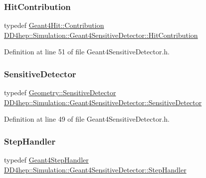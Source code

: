 \subsubsection{\texorpdfstring{Hit\+Contribution}{HitContribution}}
{\footnotesize\ttfamily typedef \hyperlink{class_d_d4hep_1_1_simulation_1_1_geant4_hit_a03a5270c4d1410302fe278ce6a47f268}{Geant4\+Hit\+::\+Contribution} \hyperlink{class_d_d4hep_1_1_simulation_1_1_geant4_sensitive_detector_a82e16b04c44370489f88b1e6a1ef2ab0}{D\+D4hep\+::\+Simulation\+::\+Geant4\+Sensitive\+Detector\+::\+Hit\+Contribution}}



Definition at line 51 of file Geant4\+Sensitive\+Detector.\+h.

\hypertarget{class_d_d4hep_1_1_simulation_1_1_geant4_sensitive_detector_a6375f9a4f776b531e443483ff9fa8c28}{}\label{class_d_d4hep_1_1_simulation_1_1_geant4_sensitive_detector_a6375f9a4f776b531e443483ff9fa8c28} 
\subsubsection{\texorpdfstring{Sensitive\+Detector}{SensitiveDetector}}
{\footnotesize\ttfamily typedef \hyperlink{class_d_d4hep_1_1_geometry_1_1_sensitive_detector}{Geometry\+::\+Sensitive\+Detector} \hyperlink{class_d_d4hep_1_1_simulation_1_1_geant4_sensitive_detector_a6375f9a4f776b531e443483ff9fa8c28}{D\+D4hep\+::\+Simulation\+::\+Geant4\+Sensitive\+Detector\+::\+Sensitive\+Detector}}



Definition at line 49 of file Geant4\+Sensitive\+Detector.\+h.

\hypertarget{class_d_d4hep_1_1_simulation_1_1_geant4_sensitive_detector_ad8f31d0680aa437d6eb7242292e50a15}{}\label{class_d_d4hep_1_1_simulation_1_1_geant4_sensitive_detector_ad8f31d0680aa437d6eb7242292e50a15} 
\subsubsection{\texorpdfstring{Step\+Handler}{StepHandler}}
{\footnotesize\ttfamily typedef \hyperlink{class_d_d4hep_1_1_simulation_1_1_geant4_step_handler}{Geant4\+Step\+Handler} \hyperlink{class_d_d4hep_1_1_simulation_1_1_geant4_sensitive_detector_ad8f31d0680aa437d6eb7242292e50a15}{D\+D4hep\+::\+Simulation\+::\+Geant4\+Sensitive\+Detector\+::\+Step\+Handler}}



